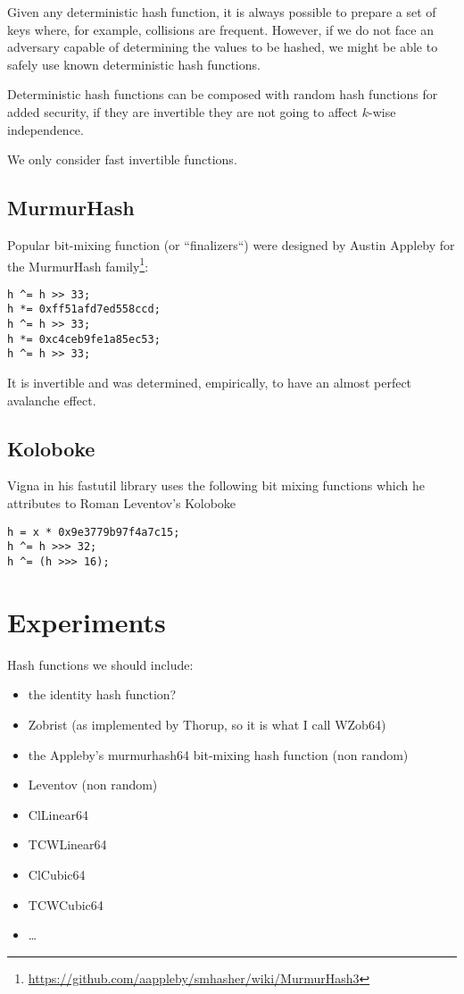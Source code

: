 \documentclass{article}
\begin{document}
Given any deterministic hash function, it is always possible to prepare a set of keys where, for example, collisions are frequent. However, if we do not face an adversary capable of determining the values to be hashed, we might be able to  safely use known deterministic hash functions. 

Deterministic hash functions can be composed with random hash functions for added security, if they are invertible they are not going to affect $k$-wise independence.


We only consider fast invertible functions.


\subsection{MurmurHash}

Popular bit-mixing function (or ``finalizers``) were designed by Austin	Appleby for the MurmurHash family\footnote{\url{https://github.com/aappleby/smhasher/wiki/MurmurHash3}}:


\begin{lstlisting}
h ^= h >> 33;
h *= 0xff51afd7ed558ccd;
h ^= h >> 33;
h *= 0xc4ceb9fe1a85ec53;
h ^= h >> 33;
\end{lstlisting}

It is invertible and was determined, empirically, to have an almost perfect avalanche effect.

\subsection{Koloboke}

Vigna in his fastutil library uses the following bit mixing functions which he attributes to  Roman Leventov's Koloboke


\begin{lstlisting}
h = x * 0x9e3779b97f4a7c15;
h ^= h >>> 32;
h ^= (h >>> 16);
\end{lstlisting}


\section{Experiments}



Hash functions we should include:
\begin{itemize}
\item the identity hash function? 
\item Zobrist (as implemented by Thorup, so it is what I call WZob64)
\item  the Appleby's murmurhash64 bit-mixing hash function (non random)
\item Leventov (non random)
\item ClLinear64
\item TCWLinear64
\item ClCubic64
\item TCWCubic64~\cite{Thorup:2004:TBH:982792.982884}
\item \ldots 
\end{itemize}
\end{document}
